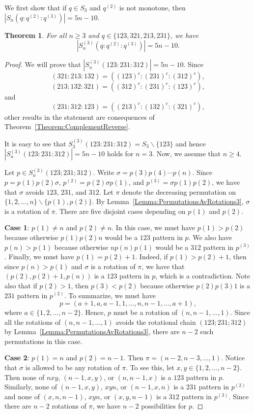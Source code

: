 \documentclass[10pt,a4paper]{amsart}
\newtheorem{theorem}{Theorem}[section]
\numberwithin{equation}{section}
\begin{document}
We first show that if $q\in S_3$ and $q^{(2)}$ is not monotone, then $|S_n(q:q^{(2)}:q^{(3)})|=5n-10$.
\begin{theorem}\label{Theorem:3ChainLinear}
For all $n\geq3$ and $q\in\{123,321,213,231\}$, we have
\[
|S_n^{(3)}(q:q^{(2)}:q^{(3)})|=5n-10.
\]
\end{theorem}
\begin{proof}
We will prove that $|S_n^{(3)}(123:231:312)|=5n-10$. Since
\[
(321:213:132)=((123)^c:(231)^c:(312)^c),
\]
\[
(213:132:321)=((312)^r:(231)^r:(123)^r),
\]
and
\[
(231:312:123)=((213)^c:(132)^c:(321)^c),
\]
other results in the statement are consequences of Theorem~\ref{Theorem:ComplementReverse}. 

It is easy to see that $S_3^{(3)}(123:231:312)=S_3\backslash\{123\}$ and hence $|S_n^{(3)}(123:231:312)|=5n-10$ holds for $n=3$. Now, we assume that $n\geq4$.

Let $p\in S_n^{(3)}(123;231;312)$. Write $\sigma=p(3)p(4)\cdots p(n)$. Since $p=p(1)p(2)\sigma$, $p^{(2)}=p(2)\sigma p(1)$, 
and $p^{(3)}=\sigma p(1)p(2)$, we have that $\sigma$ avoids $123$, $231$, and $312$. Let $\pi$ denote the decreasing permutation on $\{1,2,\ldots,n\}\backslash\{p(1),p(2)\}$. By Lemma~\ref{Lemma:PermutationsAvRotations3}, $\sigma$ is a rotation of $\pi$. There are five 
disjoint cases depending on $p(1)$ and $p(2)$.

{\bf Case 1}:
$p(1)\neq n$ and $p(2)\neq n$. In this case, we must have $p(1)>p(2)$ because otherwise $p(1)p(2)n$ would be a $123$ pattern in $p$. We also have $p(n)>p(1)$ because otherwise $np(n)p(1)$ would be a $312$ pattern in $p^{(3)}$.
Finally, we must have $p(1)=p(2)+1$. Indeed, if $p(1)>p(2)+1$, then since $p(n)>p(1)$ and $\sigma$ is a rotation of $\pi$, we have that $(p(2),p(2)+1,p(n))$ is a $123$ pattern in $p$, which is a contradiction. Note also that if $p(2)>1$, then $p(3)<p(2)$ because otherwise $p(2)p(3)1$ is a $231$ pattern in $p^{(2)}$. To summarize, we must have 
\[
p=(a+1,a,a-1,1,\ldots,n,n-1,\ldots,a+1),
\]
where $a \in \{1,2, \dots, n-2\}$. Hence, $p$ must be a rotation of $(n,n-1,\ldots,1)$. Since all the rotations of $(n,n-1,\ldots,1)$ avoids the rotational chain $(123;231;312)$ by Lemma~\ref{Lemma:PermutationsAvRotations3}, there are $n-2$ such permutations in this case.


{\bf Case 2}: $p(1)=n$ and $p(2)=n-1$. Then $\pi=(n-2,n-3,\ldots,1)$. Notice that $\sigma$ is allowed to be any rotation of $\pi$. To see this, let $x,y\in\{1,2,\ldots,n-2\}$. Then none of $nxy$, $(n-1,x,y)$, or $(n,n-1,x)$ is a $123$ pattern in $p$. 
Similarly, none of $(n-1,x,y)$, $xyn$, or $(n-1,x,n)$ is a $231$ pattern in $p^{(2)}$ and none of $(x,n,n-1)$, $xyn$, or $(x,y,n-1)$ is a $312$ pattern in $p^{(3)}$. Since there are $n-2$ rotations of $\pi$, we have $n-2$ possibilities for $p$.


\end{proof}
\end{document}

